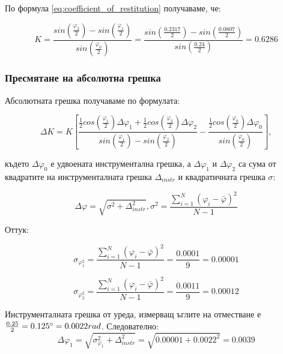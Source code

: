\documentclass[12pt]{article}
\begin{document}
По формула \ref{eq:coefficient_of_restitution} получаваме, че:

\begin{displaymath}
    K = 
    \frac{sin(\frac{\varphi_2}{2}) - sin(\frac{\varphi_1}{2})}{sin(\frac{\varphi_0}{2})} = 
    \frac{sin(\frac{0.2317}{2}) - sin(\frac{0.0807}{2})}{sin(\frac{0.24}{2})} = 
    0.6286
\end{displaymath}


\subsubsection{Пресмятане на абсолютна грешка}
Абсолютната грешка получаваме по формулата: 

\begin{equation}\label{eq:cor-error}
    \Delta K = K
    \left[
        \frac{\frac{1}{2}cos(\frac{\varphi_1}{2})\Delta\varphi_1 + \frac{1}{2}cos(\frac{\varphi_2}{2})\Delta\varphi_2}{sin(\frac{\varphi_1}{2}) - sin(\frac{\varphi_2}{2})} -     
        \frac{\frac{1}{2}cos(\frac{\varphi_0}{2})\Delta\varphi_0}{sin(\frac{\varphi_0}{2})}
    \right],
\end{equation}

където $\Delta \varphi_0$ е удвоената инструментална грешка, а $\Delta \varphi_1$ и $\Delta \varphi_2$ са сума от квадратите на инструменталната грешка $\Delta_{instr}$ и квадратичната грешка $\sigma$:

\begin{equation}
    \Delta\varphi = \sqrt{\sigma^2 + \Delta_{instr}^2}, \sigma^2 = \frac{\sum_{i=1}^N{(\varphi_i - \bar{\varphi})^2}}{N-1} 
\end{equation}

Оттук:

\begin{displaymath}
    \sigma_\varphi_1^2 = \frac{\sum_{i=1}^N{(\varphi_i - \bar{\varphi})^2}}{N - 1} = \frac{0.0001}{9} = 0.00001
\end{displaymath}

\begin{displaymath}
    \sigma_\varphi_2^2 = \frac{\sum_{i=1}^N{(\varphi_i - \bar{\varphi})^2}}{N - 1} = \frac{0.0011}{9} = 0.00012
\end{displaymath}

Инструменталната грешка от уреда, измерващ ъглите на отместване е $\frac{0.25}{2} = 0.125\degree = 0.0022 rad$. Следователно:
\begin{displaymath}
    \Delta\varphi_1 = \sqrt{\sigma_{\varphi_1}^2 + \Delta_{instr}^2} = \sqrt{0.00001 + 0.0022^2} = 0.0039
\end{displaymath}
\end{document}

